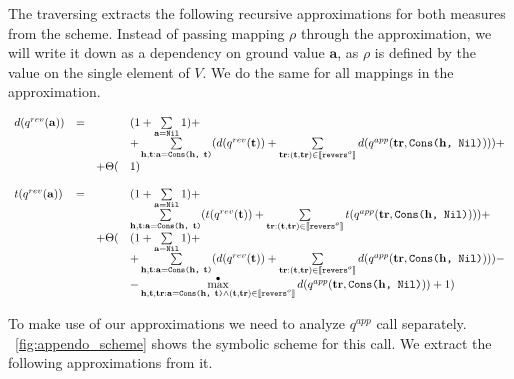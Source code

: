 The traversing extracts the following recursive approximations for both measures from the scheme. Instead of passing mapping $\rho$ through the approximation, we will write it down as a dependency on ground value $\mathbf{a}$, as $\rho$ is defined by the value on the single element of $V$. We do the same for all mappings in the approximation.

\[
\begin{array}{lcll}
d(q^{rev}(\mathbf{a})) & = & & (1 + \sum\limits_{\mathbf{a} = \texttt{Nil}} 1) + \\
 & & & + \sum\limits_{\mathbf{h}, \mathbf{t}: \mathbf{a} = \texttt{Cons($\mathbf{h}$, $\mathbf{t}$)}} ( d(q^{rev}(\mathbf{t})) + \sum\limits_{\mathbf{tr}: (\mathbf{t}, \mathbf{tr}) \in \llbracket \texttt{revers$^o$} \rrbracket} d(q^{app}(\mathbf{tr},\texttt{Cons($\mathbf{h}$, Nil)}))) + \\
 & & + \Theta( & 1) \\
\\
t(q^{rev}(\mathbf{a})) & = & & (1 + \sum\limits_{\mathbf{a} = \texttt{Nil}} 1) + \\
 & & & \sum\limits_{\mathbf{h}, \mathbf{t}: \mathbf{a} = \texttt{Cons($\mathbf{h}$, $\mathbf{t}$)}} ( t(q^{rev}(\mathbf{t})) + \sum\limits_{\mathbf{tr}: (\mathbf{t}, \mathbf{tr}) \in \llbracket \texttt{revers$^o$} \rrbracket} t(q^{app}(\mathbf{tr},\texttt{Cons($\mathbf{h}$, Nil)}))) + \\
 & & + \Theta( & (1 + \sum\limits_{\mathbf{a} = \texttt{Nil}} 1) + \\
 & & & + \sum\limits_{\mathbf{h}, \mathbf{t}: \mathbf{a} = \texttt{Cons($\mathbf{h}$, $\mathbf{t}$)}} ( d(q^{rev}(\mathbf{t})) + \sum\limits_{\mathbf{tr}: (\mathbf{t}, \mathbf{tr}) \in \llbracket \texttt{revers$^o$} \rrbracket} d(q^{app}(\mathbf{tr},\texttt{Cons($\mathbf{h}$, Nil)}))) - \\
 & & & - \max^{\bullet}\limits_{\mathbf{h}, \mathbf{t}, \mathbf{tr}: \mathbf{a} = \texttt{Cons($\mathbf{h}$, $\mathbf{t}$)} \land (\mathbf{t}, \mathbf{tr}) \in \llbracket \texttt{revers$^o$} \rrbracket} d(q^{app}(\mathbf{tr},\texttt{Cons($\mathbf{h}$, Nil)})) + 1)
\end{array}
\]

To make use of our approximations we need to analyze $q^{app}$ call separately. \figureword~\ref{fig:appendo_scheme} shows the symbolic scheme for this call. We extract the following approximations from it.

